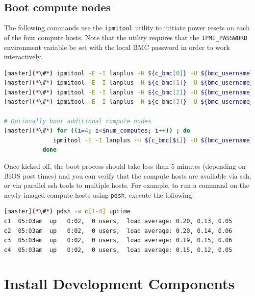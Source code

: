 \documentclass[letterpaper]{article}
\begin{document}

\subsection{Boot compute nodes} \label{sec:boot_computes}

 
The following commands use the \texttt{ipmitool} utility to initiate power
resets on each of the four compute hosts. Note that the utility requires that
the \texttt{IPMI\_PASSWORD} environment variable be set with the local BMC password in
order to work interactively.


\begin{lstlisting}[language=bash,keywords={},upquote=true]
[master](*\#*) ipmitool -E -I lanplus -H ${c_bmc[0]} -U ${bmc_username} chassis power reset   # power cycle c1
[master](*\#*) ipmitool -E -I lanplus -H ${c_bmc[1]} -U ${bmc_username} chassis power reset   # power cycle c2
[master](*\#*) ipmitool -E -I lanplus -H ${c_bmc[2]} -U ${bmc_username} chassis power reset   # power cycle c3
[master](*\#*) ipmitool -E -I lanplus -H ${c_bmc[3]} -U ${bmc_username} chassis power reset   # power cycle c4

# Optionally boot additional compute nodes
[master](*\#*) for ((i=4; i<$num_computes; i++)) ; do
              ipmitool -E -I lanplus -H ${c_bmc[$i]} -U ${bmc_username} chassis power reset
           done
\end{lstlisting} 

Once kicked off, the boot process should take less than 5 minutes (depending on
BIOS post times) and you can verify that the compute hosts are available via
ssh, or via parallel ssh tools to multiple hosts. For example, to run a command
on the newly imaged compute hosts using \texttt{pdsh}, execute the following:

\begin{lstlisting}[language=bash]
[master](*\#*) pdsh -w c[1-4] uptime
c1  05:03am  up   0:02,  0 users,  load average: 0.20, 0.13, 0.05
c2  05:03am  up   0:02,  0 users,  load average: 0.20, 0.14, 0.06
c3  05:03am  up   0:02,  0 users,  load average: 0.19, 0.15, 0.06
c4  05:03am  up   0:02,  0 users,  load average: 0.15, 0.12, 0.05
\end{lstlisting}



\section{Install \OHPC{} Development Components}
\end{document}
